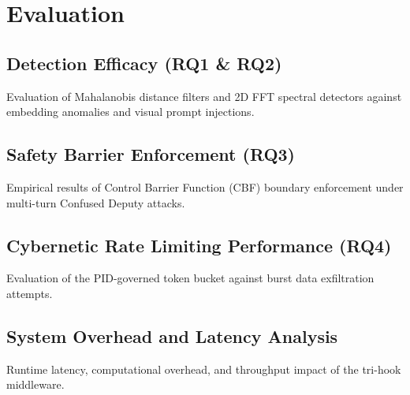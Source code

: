 \chapter{Evaluation}
\label{ch:evaluation}

\section{Detection Efficacy (RQ1 \& RQ2)}
Evaluation of Mahalanobis distance filters and 2D FFT spectral detectors against embedding anomalies and visual prompt injections.

\section{Safety Barrier Enforcement (RQ3)}
Empirical results of Control Barrier Function (CBF) boundary enforcement under multi-turn Confused Deputy attacks.

\section{Cybernetic Rate Limiting Performance (RQ4)}
Evaluation of the PID-governed token bucket against burst data exfiltration attempts.

\section{System Overhead and Latency Analysis}
Runtime latency, computational overhead, and throughput impact of the tri-hook middleware.
